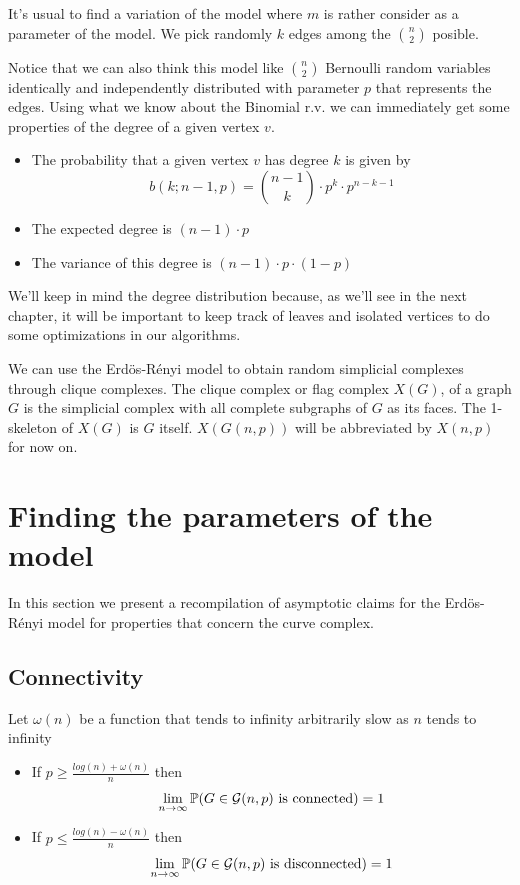 It's usual to find a variation of the model where $m$ is rather consider as a parameter of the model. We pick randomly $k$ edges among the $\binom{n}{2}$ posible. 

Notice that we can also think this model like $\binom{n}{2}$ Bernoulli random variables identically and independently distributed with parameter $p$ that represents the edges. Using what we know about the Binomial r.v. we can immediately get some properties of the degree of a given vertex $v$. 

\begin{itemize}
\item The probability that a given vertex $v$ has degree $k$ is given by
$$b(k; n-1,p) = \binom{n-1}{k} \cdot p^{k} \cdot p^{n-k-1}$$
\item The expected degree is $(n-1)\cdot p$
\item The variance of this degree is $(n-1)\cdot p \cdot (1-p)$
\end{itemize}

We'll keep in mind the degree distribution because, as we'll see in the next chapter, it will be important to keep track of leaves and isolated vertices to do some optimizations in our algorithms.

 We can use the Erdös-Rényi model to obtain random simplicial complexes through clique complexes. The clique complex or flag complex $X(G)$, of a graph $G$ is the simplicial complex with all complete subgraphs of $G$ as its faces. The 1-skeleton of $X(G)$ is $G$ itself. $X(G(n, p))$ will be abbreviated by $X(n, p)$ for now on.

\section{Finding the parameters of the model}

In this section we present a recompilation of asymptotic claims for the Erdös-Rényi model for properties that concern the curve complex.

\subsection{Connectivity}
\begin{theorem}
Let $\omega(n)$ be a function that tends to infinity arbitrarily slow as $n$ tends to infinity
\begin{itemize}
\item If $p\geq \frac{log(n)+ \omega(n)}{n}$ then 
$$\lim_{n \to \infty} \mathbb{P}(G \in \mathcal{G}(n,p) \text{ is connected}) = 1$$
\item If $p\leq \frac{log(n)- \omega(n)}{n}$ then
$$\lim_{n \to \infty} \mathbb{P}(G \in \mathcal{G}(n,p) \text{ is disconnected}) = 1$$
\end{itemize}
\end{theorem}
 
